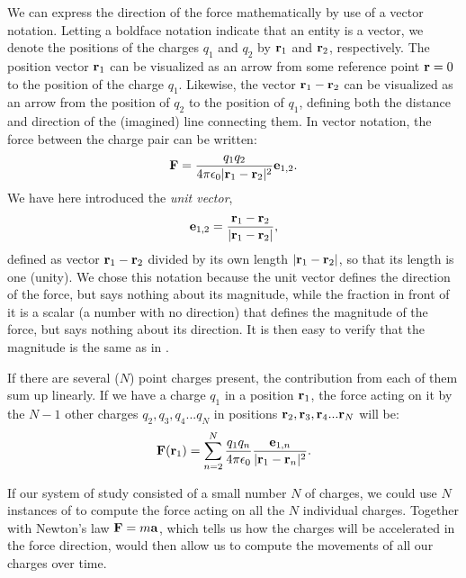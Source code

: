 We can express the direction of the force mathematically by use of a vector notation. Letting a boldface notation indicate that an entity is a vector, we denote the positions of the charges $q_1$ and $q_2$ by ${\bf r}_1$ and ${\bf r}_2$, respectively. The position vector ${\bf r}_1$ can be visualized as an arrow from some reference point ${\bf r} =0$ to the position of the charge $q_1$. Likewise, the vector ${\bf r}_1-{\bf r}_2$ can be visualized as an arrow from the position of $q_2$ to the position of $q_1$, defining both the distance and direction of the (imagined) line connecting them. In vector notation, the force between the charge pair can be written:
\begin{equation}
{\bf F} = \frac{q_1q_2}{4\pi \epsilon_0 |{\bf r}_1-{\bf r}_2|^2} {{\bf e}}_{1,2}.
\label{eq:Basics:CoulombFvec}
\end{equation}
We have here introduced the \textit{unit vector},
\begin{equation}
{{\bf e}}_{1,2} = \frac{{\bf r}_1 - {\bf r}_2}{|{\bf r}_1-{\bf r}_2|},
\label{eq:Basics:UnitVector}
\end{equation}
defined as vector ${\bf r}_1-{\bf r}_2$ divided by its own length $|{\bf r}_1-{\bf r}_2|$, so that its length is one (unity). We chose this notation because the unit vector defines the direction of the force, but says nothing about its magnitude, while the fraction in front of it is a scalar (a number with no direction) that defines the magnitude of the force, but  says nothing about its direction. It is then easy to verify that the magnitude is the same as in .

If there are several ($N$) point charges present, the contribution from each of them sum up linearly. If we have a charge $q_1$ in a position ${\bf r}_1$, the force acting on it by the $N-1$ other charges $q_2, q_3, q_4 ... q_{N}$ in positions ${\bf r}_2, {\bf r}_3, {\bf r}_4 ... {\bf r}_{N}$ will be:
\begin{equation}
{\bf F}({\bf r}_1) = \sum_{n=2}^{N} \frac{q_1 q_n}{4\pi \epsilon_0} \frac{{{\bf e}}_{1,n}}{|{\bf r}_1-{\bf r}_n|^2}.
\label{eq:Basics:CoulombFN}
\end{equation}

If our system of study consisted of a small number $N$ of charges, we could use $N$ instances of  to compute the force acting on all the $N$ individual charges. Together with Newton's law ${\bf F} = m {\bf a}$, which tells us how the charges will be accelerated in the force direction,  would then allow us to compute the movements of all our charges over time.

